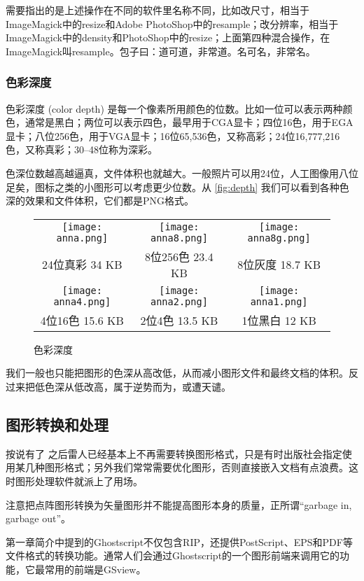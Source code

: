 需要指出的是上述操作在不同的软件里名称不同，比如改尺寸，相当于ImageMagick中的resize和Adobe PhotoShop中的resample；改分辨率，相当于ImageMagick中的density和PhotoShop中的resize；上面第四种混合操作，在ImageMagick叫resample。包子曰：道可道，非常道。名可名，非常名。

\subsubsection{色彩深度}

色彩深度 (color depth) 是每一个像素所用颜色的位数。比如一位可以表示两种颜色，通常是黑白；两位可以表示四色，最早用于CGA显卡；四位16色，用于EGA显卡；八位256色，用于VGA显卡；16位65,536色，又称高彩；24位16,777,216色，又称真彩；30--48位称为深彩。

色深位数越高越逼真，文件体积也就越大。一般照片可以用24位，人工图像用八位足矣，图标之类的小图形可以考虑更少位数。从 \autoref{fig:depth} 我们可以看到各种色深的效果和文件体积，它们都是PNG格式。

\begin{figure}[htbp]
\centering
\begin{tabular}{ccc}
    \texttt{[image: anna.png]} & \texttt{[image: anna8.png]} &  \texttt{[image: anna8g.png]} \\
    24位真彩 34 KB & 8位256色 23.4 KB & 8位灰度 18.7 KB \\
    \texttt{[image: anna4.png]} & \texttt{[image: anna2.png]} &  \texttt{[image: anna1.png]} \rule{0pt}{111pt} \\
    4位16色 15.6 KB & 2位4色 13.5 KB & 1位黑白 12 KB
\end{tabular}
\caption{色彩深度}
\label{fig:depth}
\end{figure}

我们一般也只能把图形的色深从高改低，从而减小图形文件和最终文档的体积。反过来把低色深从低改高，属于逆势而为，或遭天谴。

\subsection{图形转换和处理}

按说有了 \XeLaTeX 之后雷人已经基本上不再需要转换图形格式，只是有时出版社会指定使用某几种图形格式；另外我们常常需要优化图形，否则直接嵌入文档有点浪费。这时图形处理软件就派上了用场。

注意把点阵图形转换为矢量图形并不能提高图形本身的质量，正所谓“garbage in, garbage out”。

第一章简介中提到的Ghostscript不仅包含RIP，还提供PostScript、EPS和PDF等文件格式的转换功能。通常人们会通过Ghostscript的一个图形前端来调用它的功能，它最常用的前端是GSview。


